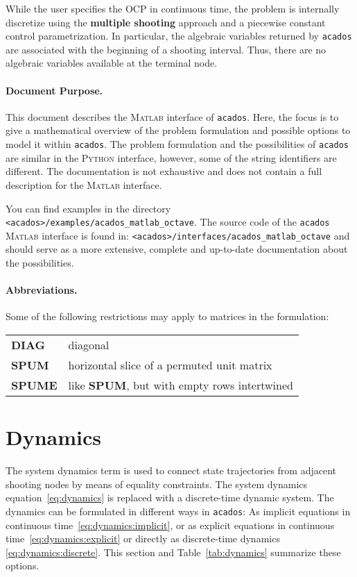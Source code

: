 \documentclass[english]{article}
\newcommand{\code}[1]{\texttt{#1}}
\newcommand{\acados}{\texttt{acados}}
\newcommand{\matlab}{\textsc{Matlab}}
\newcommand{\python}{\textsc{Python}}
\begin{document}
While the user specifies the OCP in continuous time, the problem is internally discretize using the \textbf{multiple shooting} approach and a piecewise constant control parametrization.
In particular, the algebraic variables returned by \acados{} are associated with the beginning of a shooting interval.
Thus, there are no algebraic variables available at the terminal node.

%

%
\paragraph{Document Purpose.}
This document describes the \matlab{} interface of \acados.
Here, the focus is to give a mathematical overview of the problem formulation and possible options to model it within \acados.
The problem formulation and the possibilities of \acados{} are similar in the \python{} interface, however, some of the string identifiers are different.
The documentation is not exhaustive and does not contain a full description for the \matlab{} interface.

You can find examples in the directory \code{<acados>/examples/acados\_matlab\_octave}.
The source code of the \acados{} \matlab{} interface is found in: \code{<acados>/interfaces/acados\_matlab\_octave} and should serve as a more extensive, complete and up-to-date documentation about the possibilities.

\paragraph{Abbreviations.}
Some of the following restrictions may apply to matrices in the formulation:
\begin{center}
	\begin{tabular}{ll}
		\textbf{DIAG} & diagonal\\
		\textbf{SPUM} & horizontal slice of a permuted unit matrix\\
		\textbf{SPUME} & like \textbf{SPUM}, but with empty rows intertwined
	\end{tabular}
\end{center}


\section{Dynamics}\label{sec:dynamics}
%
The system dynamics term is used to connect state trajectories from adjacent shooting nodes by means of equality constraints.
%
The system dynamics equation~\eqref{eq:dynamics} is replaced with a discrete-time dynamic system.
The dynamics can be formulated in different ways in \acados:
As implicit equations in continuous time~\eqref{eq:dynamics:implicit}, or as explicit equations in continuous time~\eqref{eq:dynamics:explicit} or directly as discrete-time dynamics \eqref{eq:dynamics:discrete}.
This section and Table~\ref{tab:dynamics} summarize these options.
%
\end{document}
